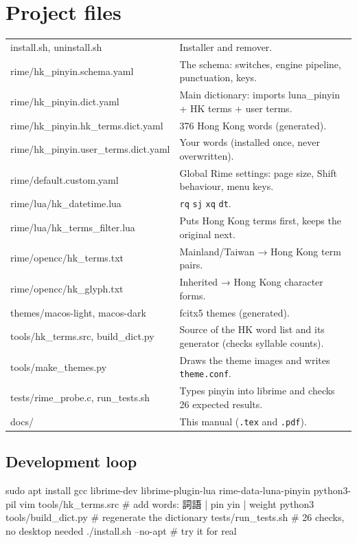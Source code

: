 \documentclass[11pt,a4paper]{article}
\newcommand{\code}[1]{\texttt{#1}}
\newenvironment{codeblock}{\begin{tcolorbox}[codebox]}{\end{tcolorbox}}
\begin{document}
\section{Project files}
\begin{center}
\renewcommand{\arraystretch}{1.18}
\begin{tabularx}{\linewidth}{@{}>{\ttfamily\small}lX@{}}
\toprule
install.sh, uninstall.sh & Installer and remover. \\
rime/hk\_pinyin.schema.yaml & The schema: switches, engine pipeline, punctuation, keys. \\
rime/hk\_pinyin.dict.yaml & Main dictionary: imports luna\_pinyin + HK terms + user terms. \\
rime/hk\_pinyin.hk\_terms.dict.yaml & 376 Hong Kong words (generated). \\
rime/hk\_pinyin.user\_terms.dict.yaml & Your words (installed once, never overwritten). \\
rime/default.custom.yaml & Global Rime settings: page size, Shift behaviour, menu keys. \\
rime/lua/hk\_datetime.lua & \code{rq} \code{sj} \code{xq} \code{dt}. \\
rime/lua/hk\_terms\_filter.lua & Puts Hong Kong terms first, keeps the original next. \\
rime/opencc/hk\_terms.txt & Mainland/Taiwan → Hong Kong term pairs. \\
rime/opencc/hk\_glyph.txt & Inherited → Hong Kong character forms. \\
themes/macos-light, macos-dark & fcitx5 themes (generated). \\
tools/hk\_terms.src, build\_dict.py & Source of the HK word list and its generator (checks syllable counts). \\
tools/make\_themes.py & Draws the theme images and writes \code{theme.conf}. \\
tests/rime\_probe.c, run\_tests.sh & Types pinyin into librime and checks 26 expected results. \\
docs/ & This manual (\code{.tex} and \code{.pdf}). \\
\bottomrule
\end{tabularx}
\end{center}

\subsection{Development loop}
\begin{codeblock}
\begin{shell}
sudo apt install gcc librime-dev librime-plugin-lua rime-data-luna-pinyin python3-pil
vim tools/hk_terms.src            # add words:  詞語 | pin yin | weight
python3 tools/build_dict.py       # regenerate the dictionary
tests/run_tests.sh                # 26 checks, no desktop needed
./install.sh --no-apt             # try it for real
\end{shell}
\end{codeblock}
\end{document}
